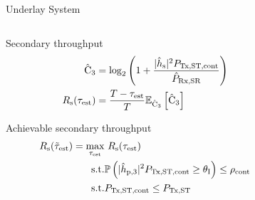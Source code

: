 \documentclass[16pt]{beamer}
\newcommand{\fs}[2]{\fontsize{#1 pt}{#2}\selectfont}
\begin{document}
\begin{frame}[t]{Underlay System}
	\vspace{-4.5mm}
	\fs{7}{8}
	\begin{columns}
		\begin{column}{0.45\columnwidth}
			\begin{block}{\scriptsize Secondary throughput} %
			\vspace{-3mm}
			\begin{align*}
				\hat{\text{{C}}}_{\text{3}}  &= \log_2 \left(1 + \frac{|\hat{h}_{\text{s}}|^2 P_{\text{Tx,ST,cont}}}{\hat{P}_{\text{Rx,SR}}} \right) \\
				R_{\text{s}}(\tau_{\text{est}}) &= \frac{T - \tau_{\text{est}}}{T} {\mathbb E}_{\hat{\text{{C}}}_{\text{3}}}\left[ \hat{\text{{C}}}_{\text{3}} \right] 
			\end{align*}
			\end{block}

			\begin{block}{\scriptsize Achievable secondary throughput} 
			\vspace{-3mm}
			\begin{align*}
				R_{\text{s}}(\tilde{\tau}_{\text{est}})  = \operatorname*{max}_{\tau_{\text{est}}}  & \text{      } {R_{\text{s}}(\tau_{\text{est}})} \\
				\text{s.t.} & \mathbb P\left( |\hat{h}_{\text{p,3}}|^2 P_{\text{Tx,ST,cont}} \ge \theta_{\text{I}} \right) \le \rho_{\text{cont}} \\
				\text{s.t.} & P_{\text{Tx,ST,cont}} \le P_{\text{Tx,ST}}
			\end{align*}
			\end{block}
		\end{column}
		\begin{column}{0.55\columnwidth}
		\fs{7}{8}
		\begin{center}
                	
			\centering
\end{center}
\end{column}
\end{columns}
\end{frame}
\end{document}
